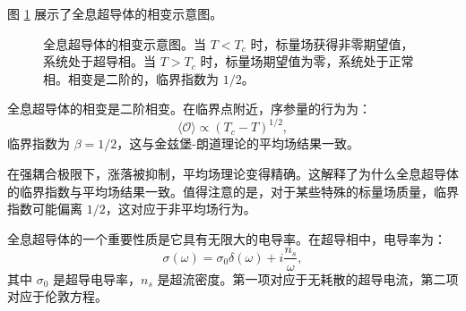 图 \ref{fig:holographic_SC} 展示了全息超导体的相变示意图。

\begin{figure}[htbp]
\centering
{}
\caption{全息超导体的相变示意图。当 $T < T_c$ 时，标量场获得非零期望值，系统处于超导相。当 $T > T_c$ 时，标量场期望值为零，系统处于正常相。相变是二阶的，临界指数为 $1/2$。}
\label{fig:holographic_SC}
\end{figure}

\begin{theorem}[全息超导体的临界指数]
全息超导体的相变是二阶相变。在临界点附近，序参量的行为为：
\begin{equation}
    \langle \mathcal{O} \rangle \propto (T_c - T)^{1/2},
\end{equation}
临界指数为 $\beta = 1/2$，这与金兹堡-朗道理论的平均场结果一致。
\end{theorem}

\begin{remark}
在强耦合极限下，涨落被抑制，平均场理论变得精确。这解释了为什么全息超导体的临界指数与平均场结果一致。值得注意的是，对于某些特殊的标量场质量，临界指数可能偏离 $1/2$，这对应于非平均场行为。
\end{remark}

\begin{property}[全息超导体的电导率]
全息超导体的一个重要性质是它具有无限大的电导率。在超导相中，电导率为：
\begin{equation}
    \sigma(\omega) = \sigma_0 \delta(\omega) + i \frac{n_s}{\omega},
\end{equation}
其中 $\sigma_0$ 是超导电导率，$n_s$ 是超流密度。第一项对应于无耗散的超导电流，第二项对应于伦敦方程。
\end{property}

